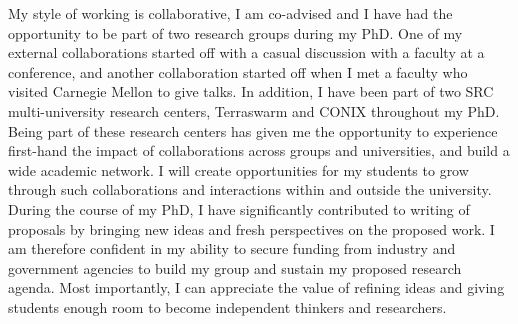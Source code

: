 \documentclass[10pt]{article}
\begin{document}
My style of working is collaborative, I am co-advised and I have had the opportunity to be part of two research groups during my PhD. One of my external collaborations started off with a casual discussion with a faculty at a conference, and another collaboration started off when I met a faculty who visited Carnegie Mellon to give talks. %
In addition, I have been part of two SRC multi-university research centers, Terraswarm and CONIX throughout my PhD. Being part of these research centers has given me the opportunity to experience first-hand the impact of collaborations across groups and universities, and build a wide academic network. I will create opportunities for my students to grow through such collaborations and interactions within and outside the university.  \\


During the course of my PhD, I have significantly contributed to writing of proposals by bringing new ideas and fresh perspectives on the proposed work. I am therefore confident in my ability to secure funding from industry and government agencies to build my group and sustain my proposed research agenda.  Most importantly, I can appreciate the value of refining ideas and giving students enough room to become independent thinkers and researchers. 



\footnotesize


\end{document}
